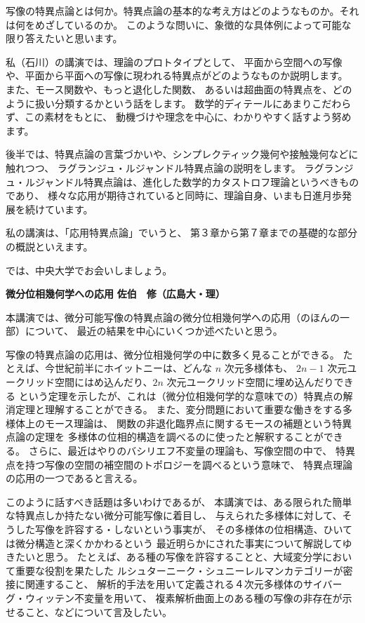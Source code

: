 \documentclass[uplatex,dvipdfmx]{jlreq}
\begin{document}
写像の特異点論とは何か。特異点論の基本的な考え方はどのようなものか。それは何をめざしているのか。
このような問いに、象徴的な具体例によって可能な限り答えたいと思います。

私（石川）の講演では、理論のプロトタイプとして、
平面から空間への写像や、平面から平面への写像に現われる特異点がどのようなものか説明します。
また、モース関数や、もっと退化した関数、
あるいは超曲面の特異点を、どのように扱い分類するかという話をします。
数学的ディテールにあまりこだわらず、この素材をもとに、
動機づけや理念を中心に、わかりやすく話すよう努めます。

後半では、特異点論の言葉づかいや、シンプレクティック幾何や接触幾何などに触れつつ、
ラグランジュ・ルジャンドル特異点論の説明をします。
ラグランジュ・ルジャンドル特異点論は、進化した数学的カタストロフ理論というべきものであり、
様々な応用が期待されていると同時に、理論自身、いまも日進月歩発展を続けています。

私の講演は、「応用特異点論」でいうと、
第３章から第７章までの基礎的な部分の概説といえます。

では、中央大学でお会いしましょう。

\newpage

\noindent
{\large\bfseries 微分位相幾何学への応用}
\hfill
{\large\bfseries 佐伯　修（広島大・理）}

\medskip

本講演では、微分可能写像の特異点論の微分位相幾何学への応用（のほんの一部）について、
最近の結果を中心にいくつか述べたいと思う。

写像の特異点論の応用は、微分位相幾何学の中に数多く見ることができる。
たとえば、今世紀前半にホイットニーは、どんな $n$ 次元多様体も、
$2n-1$ 次元ユークリッド空間にはめ込んだり、$2n$ 次元ユークリッド空間に埋め込んだりできる
という定理を示したが、これは（微分位相幾何学的な意味での）特異点の解消定理と理解することができる。
また、変分問題において重要な働きをする多様体上のモース理論は、
関数の非退化臨界点に関するモースの補題という特異点論の定理を
多様体の位相的構造を調べるのに使ったと解釈することができる。
さらに、最近はやりのバシリエフ不変量の理論も、写像空間の中で、
特異点を持つ写像の空間の補空間のトポロジーを調べるという意味で、
特異点理論の応用の一つであると言える。

このように話すべき話題は多いわけであるが、
本講演では、ある限られた簡単な特異点しか持たない微分可能写像に着目し、
与えられた多様体に対して、そうした写像を許容する・しないという事実が、
その多様体の位相構造、ひいては微分構造と深くかかわるという
最近明らかにされた事実について解説してゆきたいと思う。
たとえば、ある種の写像を許容することと、大域変分学において重要な役割を果たした
ルシュターニーク・シュニーレルマンカテゴリーが密接に関連すること、
解析的手法を用いて定義される４次元多様体のサイバーグ・ウィッテン不変量を用いて、
複素解析曲面上のある種の写像の非存在が示せること、などについて言及したい。
\end{document}
